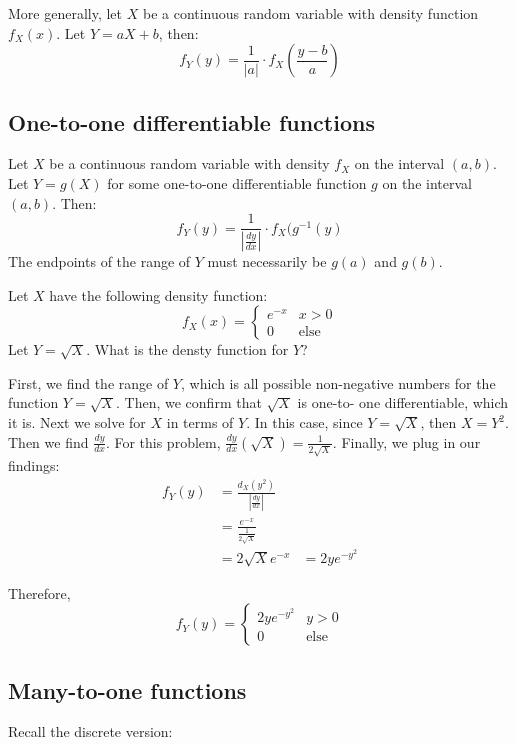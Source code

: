 \documentclass[titlepage, 12pt, leqno]{article}
\begin{document}
More generally, let $X$ be a continuous random variable with density function
$f_X(x)$. Let $Y = aX+b$, then:
\[
    \boxed{f_Y(y) = \frac{1}{|a|}\cdot f_X\left(\frac{y-b}{a}\right)} 
\]
\subsection{One-to-one differentiable functions}
Let $X$ be a continuous random variable with density $f_X$ on the interval 
$(a,b)$. Let $Y=g(X)$ for some one-to-one differentiable function $g$ on the
interval $(a,b)$. Then:
\[
    \boxed{f_Y(y) = \frac{1}{\left|\frac{dy}{dx}\right|}\cdot f_X(g^{-1}(y)} 
\]
The endpoints of the range of $Y$ must necessarily be $g(a)$ and $g(b)$.
\begin{ex}
    Let $X$ have the following density function:
    \[
        f_X(x) = 
        \begin{cases}
            e^{-x} & x>0 \\
            0 & \text{else}
        \end{cases}
    \]
    Let $Y = \sqrt{X}$. What is the densty function for $Y$?
    \vspace{10px}
    
    First, we find the range of $Y$, which is all possible non-negative numbers
    for the function $Y = \sqrt{X}$. Then, we confirm that $\sqrt{X}$ is one-to-
    one differentiable, which it is. Next we solve for $X$ in terms of $Y$. In
    this case, since $Y = \sqrt{X}$, then $X = Y^2$. Then we find $\frac{dy}{dx}$.
    For this problem, $\frac{dy}{dx}(\sqrt{X}) = \frac{1}{2\sqrt{X}}$. Finally,
    we plug in our findings:
   \begin{align*}
       f_Y(y) &= \frac{d_X(y^2)}{\left|\frac{dy}{dx}\right|} \\
              &= \frac{e^{-x}}{\frac{1}{2\sqrt{X}}} \\
              &= 2\sqrt{X}e^{-x}
              &= 2ye^{-y^2}
   \end{align*}
    
   Therefore,
   \[
   \boxed{
        f_Y(y) = 
        \begin{cases}
            2ye^{-y^2} & y>0 \\
            0 & \text{else}
        \end{cases}
   } 
   \]
\end{ex}

\subsection{Many-to-one functions}
Recall the discrete version:
\end{document}
